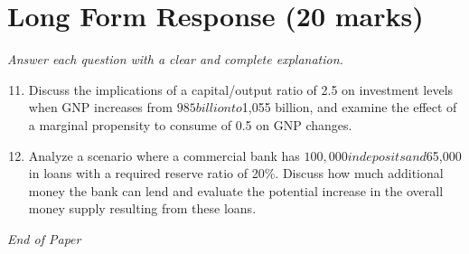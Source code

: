 \documentclass[12pt]{article}
\begin{document}
\section*{Long Form Response (20 marks)}
\textit{Answer each question with a clear and complete explanation.}
\begin{enumerate}[label=\arabic*.]
\setcounter{enumi}{10}
\item Discuss the implications of a capital/output ratio of 2.5 on investment levels when GNP increases from $985 billion to $1,055 billion, and examine the effect of a marginal propensity to consume of 0.5 on GNP changes.
\item Analyze a scenario where a commercial bank has $100,000 in deposits and $65,000 in loans with a required reserve ratio of 20\%. Discuss how much additional money the bank can lend and evaluate the potential increase in the overall money supply resulting from these loans.
\end{enumerate}

\vfill
\noindent\textit{End of Paper}
\end{document}

